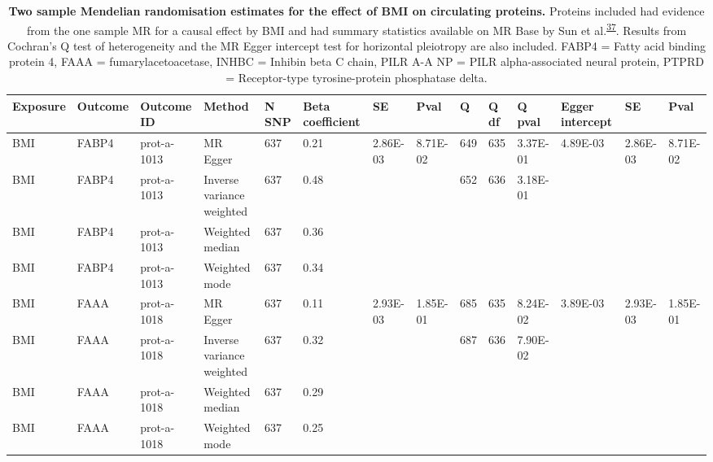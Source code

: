 \documentclass[11pt,twoside]{bristolthesis}
\begin{document}
\begin{landscape}\begin{table}

\caption[Two sample Mendelian randomisation estimates for the effect of BMI on circulating proteins]{\label{tab:Two-sample}\textbf{Two sample Mendelian randomisation estimates for the effect of BMI on circulating proteins.} Proteins included had evidence from the one sample MR for a causal effect by BMI and had summary statistics available on MR Base by Sun et al.\textsuperscript{\protect\hyperlink{ref-Sun2018}{37}}. Results from Cochran's Q test of heterogeneity and the MR Egger intercept test for horizontal pleiotropy are also included. FABP4 = Fatty acid binding protein 4, FAAA = fumarylacetoacetase, INHBC = Inhibin beta C chain, PILR A-A NP = PILR alpha-associated neural protein, PTPRD = Receptor-type tyrosine-protein phosphatase delta.}
\centering
\fontsize{6.7}{8.7}\selectfont
\begin{tabu} to 
\toprule
Exposure & Outcome & Outcome ID & Method & N SNP & Beta coefficient & SE & Pval & Q & Q df & Q pval & Egger intercept & SE & Pval\\
\midrule
BMI & FABP4 & prot-a-1013 & MR Egger & 637 & 0.21 & 2.86E-03 & 8.71E-02 & 649 & 635 & 3.37E-01 & 4.89E-03 & 2.86E-03 & 8.71E-02\\
BMI & FABP4 & prot-a-1013 & Inverse variance weighted & 637 & 0.48 &  &  & 652 & 636 & 3.18E-01 &  &  & \\
BMI & FABP4 & prot-a-1013 & Weighted median & 637 & 0.36 &  &  &  &  &  &  &  & \\
BMI & FABP4 & prot-a-1013 & Weighted mode & 637 & 0.34 &  &  &  &  &  &  &  & \\
BMI & FAAA & prot-a-1018 & MR Egger & 637 & 0.11 & 2.93E-03 & 1.85E-01 & 685 & 635 & 8.24E-02 & 3.89E-03 & 2.93E-03 & 1.85E-01\\
\addlinespace
BMI & FAAA & prot-a-1018 & Inverse variance weighted & 637 & 0.32 &  &  & 687 & 636 & 7.90E-02 &  &  & \\
BMI & FAAA & prot-a-1018 & Weighted median & 637 & 0.29 &  &  &  &  &  &  &  & \\
BMI & FAAA & prot-a-1018 & Weighted mode & 637 & 0.25 &  &  &  &  &  &  &  & \\

\end{tabu}
\end{table}
\end{landscape}
\end{document}
